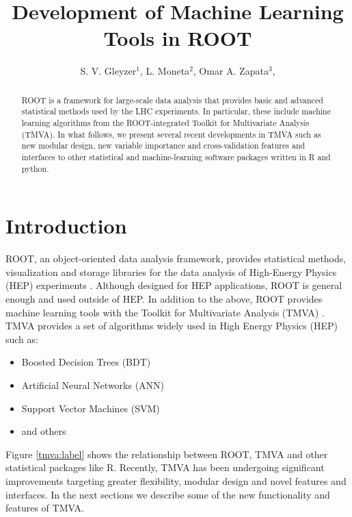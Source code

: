 \documentclass[a4paper]{jpconf}
\begin{document}
\title{Development of Machine Learning Tools in ROOT}

\author{S. V. Gleyzer$^1$, L. Moneta$^2$, Omar A. Zapata$^3$, }




\address{$^1$ University of Florida}

\address{$^2$ CERN}

\address{$^3$ University of Antioquia and Metropolitan Institute of Technology}






\begin{abstract}
ROOT is a framework for large-scale data analysis that provides basic and advanced statistical methods used by the LHC experiments. In particular, these include machine learning algorithms from the ROOT-integrated Toolkit for Multivariate Analysis (TMVA). In what follows, we present several recent developments in TMVA such as new modular design, new variable importance and cross-validation features and interfaces to other statistical and machine-learning software packages written in R and python.
\end{abstract}



\section{Introduction}
ROOT, an object-oriented data analysis framework, provides statistical methods, visualization and storage libraries for the data analysis of High-Energy Physics (HEP) experiments \cite{Antcheva20092499}. Although designed for HEP applications, ROOT is general enough and used outside of HEP. In addition to the above, ROOT provides machine learning tools with the Toolkit for Multivariate Analysis (TMVA) \cite{Hocker:2007ht}. TMVA provides a set of algorithms widely used in High Energy Physics (HEP) such as:

\begin{itemize}  
\item Boosted Decision Trees (BDT)
\item Artificial Neural Networks (ANN)
\item Support Vector Machines (SVM)
\item and others
\end{itemize}
Figure \ref{tmva:label} shows the relationship between ROOT, TMVA and other statistical packages like R. Recently, TMVA has  been undergoing significant improvements targeting greater flexibility, modular design and novel features and interfaces. In the next sections we describe some of the new functionality and features of TMVA.
\end{document}
